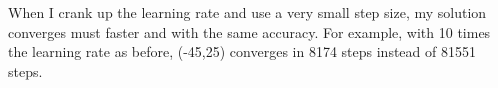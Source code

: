 \documentclass[titlepage]{tufte-book}
\begin{document}
\begin{fullwidth}
\noindent {}

\noindent {}

When I crank up the learning rate and use a very small step size, my solution converges must faster and with the same accuracy. For example, with 10 times the learning rate as before, (-45,25) converges in 8174 steps instead of 81551 steps.


\end{fullwidth}
\end{document}
